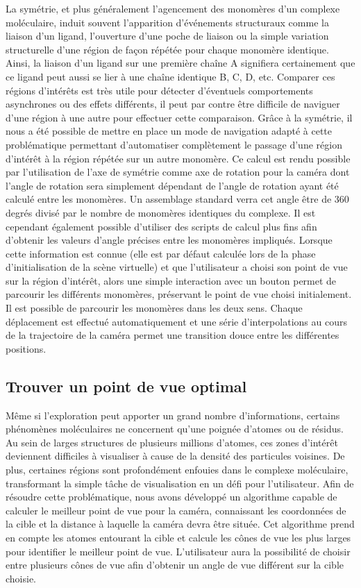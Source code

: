 La symétrie, et plus généralement l'agencement des monomères d'un complexe moléculaire, induit souvent l'apparition d'événements structuraux comme la liaison d'un ligand, l'ouverture d'une poche de liaison ou la simple variation structurelle d'une région de façon répétée pour chaque monomère identique. Ainsi, la liaison d'un ligand sur une première chaîne A signifiera certainement que ce ligand peut aussi se lier à une chaîne identique B, C, D, etc. Comparer ces régions d'intérêts est très utile pour détecter d'éventuels comportements asynchrones ou des effets différents, il peut par contre être difficile de naviguer d'une région à une autre pour effectuer cette comparaison. Grâce à la symétrie, il nous a été possible de mettre en place un mode de navigation adapté à cette problématique permettant d'automatiser complètement le passage d'une région d'intérêt à la région répétée sur un autre monomère. Ce calcul est rendu possible par l'utilisation de l'axe de symétrie comme axe de rotation pour la caméra dont l'angle de rotation sera simplement dépendant de l'angle de rotation ayant été calculé entre les monomères. Un assemblage standard verra cet angle être de 360 degrés divisé par le nombre de monomères identiques du complexe. Il est cependant également possible d'utiliser des scripts de calcul plus fins afin d'obtenir les valeurs d'angle précises entre les monomères impliqués. Lorsque cette information est connue (elle est par défaut calculée lors de la phase d'initialisation de la scène virtuelle) et que l'utilisateur a choisi son point de vue sur la région d'intérêt, alors une simple interaction avec un bouton permet de parcourir les différents monomères, préservant le point de vue choisi initialement. Il est possible de parcourir les monomères dans les deux sens. Chaque déplacement est effectué automatiquement et une série d'interpolations au cours de la trajectoire de la caméra permet une transition douce entre les différentes positions.

\subsection{Trouver un point de vue optimal}

Même si l'exploration peut apporter un grand nombre d'informations, certains phénomènes moléculaires ne concernent qu'une poignée d'atomes ou de résidus. Au sein de larges structures de plusieurs millions d'atomes, ces zones d'intérêt deviennent difficiles à visualiser à cause de la densité des particules voisines. De plus, certaines régions sont profondément enfouies dans le complexe moléculaire, transformant la simple tâche de visualisation en un défi pour l'utilisateur. Afin de résoudre cette problématique, nous avons développé un algorithme capable de calculer le meilleur point de vue pour la caméra, connaissant les coordonnées de la cible et la distance à laquelle la caméra devra être située. Cet algorithme prend en compte les atomes entourant la cible et calcule les cônes de vue les plus larges pour identifier le meilleur point de vue. L'utilisateur aura la possibilité de choisir entre plusieurs cônes de vue afin d'obtenir un angle de vue différent sur la cible choisie.

